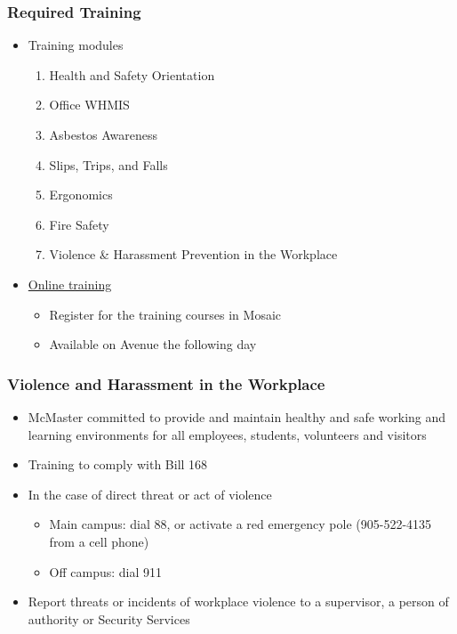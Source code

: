 \documentclass[handout]{beamer} %
\begin{document}

\begin{frame}
\frametitle{Required Training}

\begin{itemize}
\item Training modules

\begin{enumerate}
\item Health and Safety Orientation
\item Office WHMIS
\item Asbestos Awareness
\item Slips, Trips, and Falls
\item Ergonomics
\item Fire Safety
\item Violence \& Harassment Prevention in the Workplace
\end{enumerate}

\item
\href{https://hr.mcmaster.ca/employees/health_safety_well-being/our-safety/health-and-safety-training/}
{Online training}
\begin{itemize}
\item Register for the training courses in Mosaic
\item Available on Avenue the following day
\end{itemize}

\end{itemize}

\end{frame}


\begin{frame}
\frametitle{Violence and Harassment in the Workplace}

\begin{itemize}
\item McMaster committed to provide and maintain healthy and safe working and
  learning environments for all employees, students, volunteers and visitors
\item Training to comply with Bill 168
\item In the case of direct threat or act of violence
\begin{itemize}
\item Main campus: dial 88, or activate a red emergency pole (905-522-4135 from
  a cell phone)
\item Off campus: dial 911
\end{itemize}
\item Report threats or incidents of workplace violence to a supervisor, a
  person of authority or Security Services
\end{itemize}

\end{frame}
\end{document}
